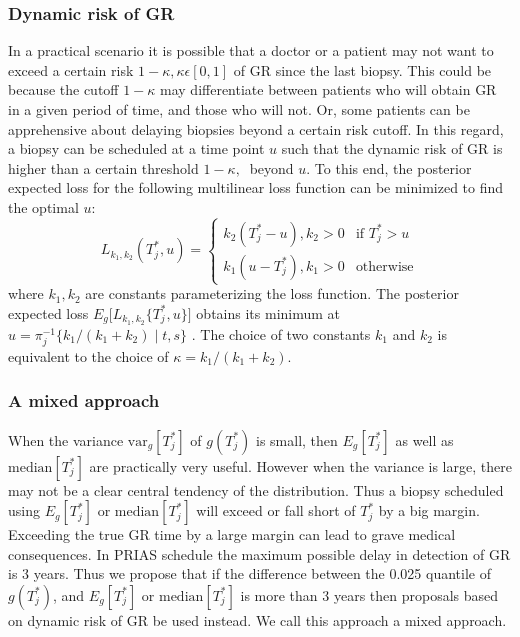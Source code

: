 \subsubsection{Dynamic risk of GR}
\label{subsubsec : dynamic_risk_definitions}
In a practical scenario it is possible that a doctor or a patient may not want to exceed a certain risk $1 - \kappa, \kappa \epsilon [0,1]$ of GR since the last biopsy. This could be because the cutoff $1 - \kappa$ may differentiate between patients who will obtain GR in a given period of time, and those who will not. Or, some patients can be apprehensive about delaying biopsies beyond a certain risk cutoff. In this regard, a biopsy can be scheduled at a time point $u$ such that the dynamic risk of GR is higher than a certain threshold $1 - \kappa,\ $ beyond $u$. To this end, the posterior expected loss for the following multilinear loss function can be minimized to find the optimal $u$:
\begin{equation}
\label{eq : loss_dynamic_risk}
L_{k_1, k_2}(T^*_j, u) =
    \begin{cases}
      k_2(T^*_j-u), k_2>0 & \text{if } T^*_j > u\\
      k_1(u-T^*_j), k_1>0 & \text{otherwise}
    \end{cases}       
\end{equation}
where $k_1, k_2$ are constants parameterizing the loss function. The posterior expected loss $E_g\big[L_{k_1, k_2}\{T^*_j, u\}\big]$ obtains its minimum at $u = \pi_j^{-1}\big\{k_1/{(k_1 + k_2)} \mid t,s \big\}$ \citep{robertBayesianChoice}. The choice of two constants $k_1$ and $k_2$ is equivalent to the choice of $\kappa = {k_1}/{(k_1 + k_2)}$.

\subsubsection{A mixed approach}
\label{subsubsec : mixed_approach}
 When the variance $\mbox{var}_g[T^*_j]$ of $g(T^*_j)$ is small, then $E_g[T^*_j]$ as well as $\mbox{median}[T^*_j]$ are practically very useful. However when the variance is large, there may not be a clear central tendency of the distribution. Thus a biopsy scheduled using $E_g[T^*_j]$ or $\mbox{median}[T^*_j]$ will exceed or fall short of $T^*_j$ by a big margin. Exceeding the true GR time by a large margin can lead to grave medical consequences. In PRIAS schedule the maximum possible delay in detection of GR is 3 years. Thus we propose that if the difference between the 0.025 quantile of $g(T^*_j)$, and $E_g[T^*_j]$ or $\mbox{median}[T^*_j]$ is more than 3 years then proposals based on dynamic risk of GR be used instead. We call this approach a mixed approach.